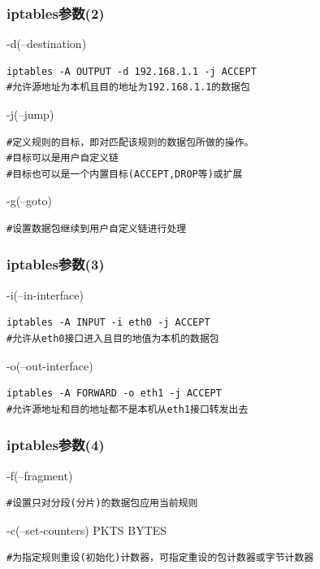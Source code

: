 \documentclass[xcolor=svgnames,presentation]{beamer}
\begin{document}
\begin{frame}[fragile]
\frametitle{iptables参数(2)}
\label{sec-2-20}
\begin{exampleblock}{-d(--destination)}
\label{sec-2-20-1}


\begin{verbatim}
iptables -A OUTPUT -d 192.168.1.1 -j ACCEPT
#允许源地址为本机且目的地址为192.168.1.1的数据包
\end{verbatim}
\end{exampleblock}
\begin{block}{-j(--jump)}
\label{sec-2-20-2}


\begin{verbatim}
#定义规则的目标，即对匹配该规则的数据包所做的操作。
#目标可以是用户自定义链
#目标也可以是一个内置目标(ACCEPT,DROP等)或扩展
\end{verbatim}
\end{block}
\begin{exampleblock}{-g(--goto)}
\label{sec-2-20-3}


\begin{verbatim}
#设置数据包继续到用户自定义链进行处理
\end{verbatim}
\end{exampleblock}
\end{frame}
\begin{frame}[fragile]
\frametitle{iptables参数(3)}
\label{sec-2-21}
\begin{exampleblock}{-i(--in-interface)}
\label{sec-2-21-1}


\begin{verbatim}
iptables -A INPUT -i eth0 -j ACCEPT
#允许从eth0接口进入且目的地值为本机的数据包
\end{verbatim}
\end{exampleblock}
\begin{block}{-o(--out-interface)}
\label{sec-2-21-2}


\begin{verbatim}
iptables -A FORWARD -o eth1 -j ACCEPT
#允许源地址和目的地址都不是本机从eth1接口转发出去
\end{verbatim}
\end{block}
\end{frame}
\begin{frame}[fragile]
\frametitle{iptables参数(4)}
\label{sec-2-22}
\begin{exampleblock}{-f(--fragment)}
\label{sec-2-22-1}


\begin{verbatim}
#设置只对分段(分片)的数据包应用当前规则
\end{verbatim}
\end{exampleblock}
\begin{block}{-c(--set-counters) PKTS BYTES}
\label{sec-2-22-2}


\begin{verbatim}
#为指定规则重设(初始化)计数器，可指定重设的包计数器或字节计数器
\end{verbatim}
\end{block}
\end{frame}
\end{document}
